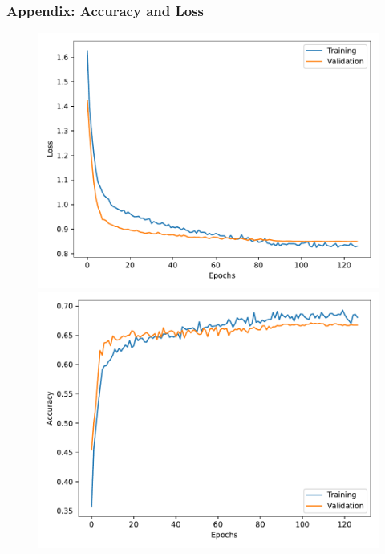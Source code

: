 \documentclass[8pt]{beamer}
\begin{document}

\printbibliography

\appendix
\begin{frame}
    \frametitle{Appendix: Accuracy and Loss}
    \begin{figure}
        \begin{minipage}[b]{0.48\textwidth}
            \centering
            \includegraphics[width=\textwidth]{figures/Loss.pdf}
        \end{minipage}
        \hfill
        \begin{minipage}[b]{0.48\textwidth}
            \centering
            \includegraphics[width=\textwidth]{figures/Acc.pdf}
        \end{minipage}
    \end{figure}
\end{frame}
\end{document}
